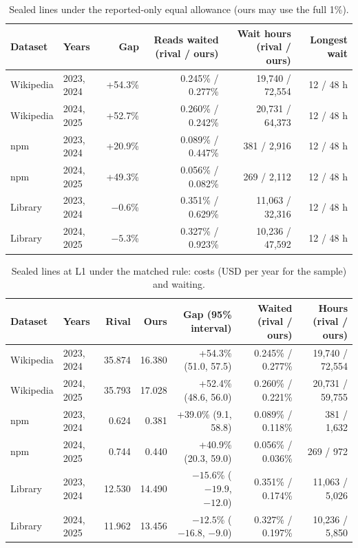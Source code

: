 \documentclass[11pt]{article}
\begin{document}
\begin{table}[H]
\centering
\caption{Sealed lines under the reported-only equal allowance (ours may use the full 1\%).}
\label{tab:equal}
\footnotesize
\begin{tabular}{@{}llrrrr@{}}
\toprule
Dataset & Years & Gap & Reads waited (rival / ours) & Wait hours (rival / ours) & Longest wait \\
\midrule
Wikipedia & 2023, 2024 & +54.3\% & 0.245\% / 0.277\% & 19,740 / 72,554 & 12 / 48 h \\
Wikipedia & 2024, 2025 & +52.7\% & 0.260\% / 0.242\% & 20,731 / 64,373 & 12 / 48 h \\
npm & 2023, 2024 & +20.9\% & 0.089\% / 0.447\% & 381 / 2,916 & 12 / 48 h \\
npm & 2024, 2025 & +49.3\% & 0.056\% / 0.082\% & 269 / 2,112 & 12 / 48 h \\
Library & 2023, 2024 & $-0.6$\% & 0.351\% / 0.629\% & 11,063 / 32,316 & 12 / 48 h \\
Library & 2024, 2025 & $-5.3$\% & 0.327\% / 0.923\% & 10,236 / 47,592 & 12 / 48 h \\
\bottomrule
\end{tabular}
\end{table}

\begin{table}[H]
\centering
\caption{Sealed lines at L1 under the matched rule: costs (USD per year for the sample) and waiting.}
\label{tab:sealed}
\footnotesize
\setlength{\tabcolsep}{4pt}
\begin{tabular}{@{}llrrrrr@{}}
\toprule
Dataset & Years & Rival & Ours & Gap (95\% interval) & Waited (rival / ours) & Hours (rival / ours) \\
\midrule
Wikipedia & 2023, 2024 & 35.874 & 16.380 & +54.3\% (51.0, 57.5) & 0.245\% / 0.277\% & 19,740 / 72,554 \\
Wikipedia & 2024, 2025 & 35.793 & 17.028 & +52.4\% (48.6, 56.0) & 0.260\% / 0.221\% & 20,731 / 59,755 \\
npm & 2023, 2024 & 0.624 & 0.381 & +39.0\% (9.1, 58.8) & 0.089\% / 0.118\% & 381 / 1,632 \\
npm & 2024, 2025 & 0.744 & 0.440 & +40.9\% (20.3, 59.0) & 0.056\% / 0.036\% & 269 / 972 \\
Library & 2023, 2024 & 12.530 & 14.490 & $-15.6$\% ($-19.9$, $-12.0$) & 0.351\% / 0.174\% & 11,063 / 5,026 \\
Library & 2024, 2025 & 11.962 & 13.456 & $-12.5$\% ($-16.8$, $-9.0$) & 0.327\% / 0.197\% & 10,236 / 5,850 \\
\bottomrule
\end{tabular}
\end{table}
\end{document}
